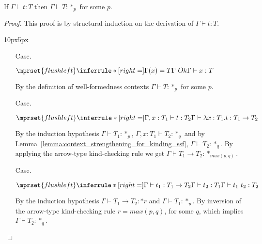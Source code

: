 \begin{lemma}[Regularity]
  If $\Gamma \vdash t:T$ then $\Gamma \vdash T:*_p$ for some $p$.
  \label{lemma:regularity_ssf}
\end{lemma}
\begin{proof}
  This proof is by structural induction on the derivation of $\Gamma
  \vdash t:T$.
  \vspace{-25px}
  \begin{changemargin}{10px}{5px}\noindent
\begin{itemize}
\item[Case.] \ \\
  \begin{center}
    \begin{math}
      $$\mprset{flushleft}
      \inferrule* [right=] {
        \Gamma(x) = T
        \\
        \Gamma\ Ok
      }{\Gamma \vdash x : T}
    \end{math}  
  \end{center}
  By the definition of well-formedness contexts $\Gamma \vdash T:*_p$ for some $p$.
  
\item[Case.] \ \\
  \begin{center}
    \begin{math}
      $$\mprset{flushleft}
      \inferrule* [right=] {
        \Gamma,x : T_1 \vdash t : T_2
      }{\Gamma \vdash \lambda x : T_1.t : T_1 \rightarrow T_2}
    \end{math}
  \end{center}
  By the induction hypothesis $\Gamma \vdash T_1:*_p$,
  $\Gamma,x:T_1 \vdash T_2:*_q$ and by Lemma~\ref{lemma:context_strengthening_for_kinding_ssf},
  $\Gamma \vdash T_2:*_q$.
  By applying the arrow-type kind-checking rule we get 
  $\Gamma \vdash T_1 \rightarrow T_2:*_{max(p,q)}$.
  
\item[Case.] \ \\
  \begin{center}
    \begin{math}
      $$\mprset{flushleft}
      \inferrule* [right=] {
        \Gamma \vdash t_1 : T_1 \rightarrow T_2 
        \\
        \Gamma \vdash t_2 : T_1
      }{\Gamma \vdash t_1\ t_2 : T_2}
    \end{math}
  \end{center}
  By the induction hypothesis $\Gamma \vdash T_1 \rightarrow T_2:*r$ and
  $\Gamma \vdash T_1:*_p$.  By inversion of the arrow-type kind-checking rule 
  $r = max(p,q)$, for some $q$, which implies $\Gamma \vdash T_2:*_q$.
  

\end{itemize}
\end{changemargin}
\end{proof}
